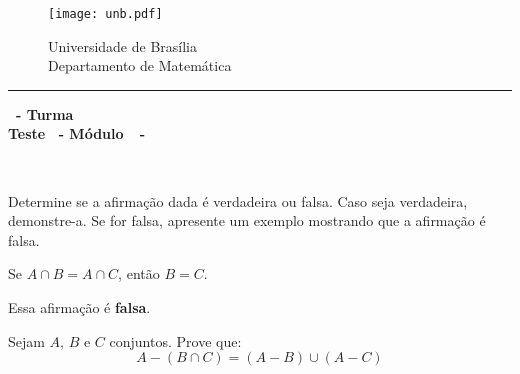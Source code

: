 \documentclass[12pt]{exam}
\begin{document}
    \begin{figure}[h]
        \begin{minipage}[c]{1.7cm}
            \texttt{[image: unb.pdf]}
        \end{minipage}
        \hspace{0pt}
        \begin{minipage}[c]{4in}
            {Universidade de Brasília} \\
            {Departamento de Matemática}
        \end{minipage}
    \end{figure}
    \hrule
    \begin{center}
        {\Large\bf \disciplina\ - Turma \turma}  \\
         {\large\bf Teste \numeroteste\ - Módulo\ \modulo\ -\ \dataavaliacao}
    \end{center}

    \\
    \vspace*{.01cm}

    \vspace{.4cm}

    \questao{} Determine se a afirmação dada é verdadeira ou falsa. Caso seja verdadeira, demonstre-a. Se for falsa, apresente um exemplo mostrando que a afirmação é falsa.
    \begin{center}
        Se $A \cap B = A \cap C$, então $B = C$.
    \end{center}
    \solucao Essa afirmação é \textbf{falsa}.

    \vspace*{.5cm}
    \questao{} Sejam $A$, $B$ e $C$ conjuntos. Prove que:
    \[
        A - (B \cap C) = (A - B) \cup (A - C)
    \]
\end{document}
